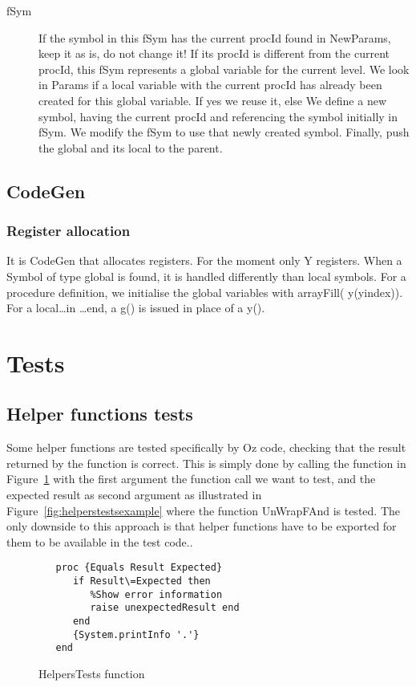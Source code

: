 \documentclass[a4paper]{memoir}
\begin{document}
\begin{description}
   \item[fSym] If the symbol in this fSym has the current procId found in NewParams, keep it as is, do not change it! 
      If its procId is different from the current procId, this fSym represents a global variable for the current level. We look in Params if a local variable with the current procId has already been created for this global variable. If yes we reuse it, else We define a new symbol, having the current procId and referencing the symbol initially in fSym. We modify the fSym to use that newly created symbol. Finally, push the global and its local to the parent.
      
\end{description}



\subsection{CodeGen}
\subsubsection{Register allocation}
It is CodeGen that allocates registers. For the moment only Y registers.
When a Symbol of type global is found, it is handled differently than local symbols.
For a procedure definition, we initialise the global variables with arrayFill( y(yindex)). 
For a local\ldots in \ldots end, a g() is issued in place of a y(). 

\section{Tests}
\subsection{Helper functions tests}
Some helper functions are tested specifically by Oz code, checking that the result returned by the function is correct. This is simply done by calling the function in Figure~\ref{fig:helperstestsfunction} with the first argument the function call we want to test, and the expected result as second argument as illustrated in Figure~\ref{fig:helperstestsexample} where the function UnWrapFAnd is tested.
The only downside to this approach is that helper functions have to be exported for them to be available in the test code..

\begin{figure}
\begin{lstlisting}
   proc {Equals Result Expected}
      if Result\=Expected then
         %Show error information
         raise unexpectedResult end
      end
      {System.printInfo '.'}
   end
\end{lstlisting}
\label{fig:helperstestsfunction}
\caption{HelpersTests function}
\end{figure}
\end{document}
